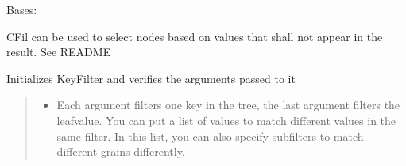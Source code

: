 \documentclass[a4paper,10pt,english]{sphinxmanual}
\begin{document}

\begin{fulllineitems}
\label{\detokenize{fagus.filters:fagus.filters.CFil}}
\pysigstartsignatures
{}
\pysigstopsignatures
\sphinxAtStartPar
Bases: {\hyperref[\detokenize{fagus.filters:fagus.filters.KFil}]{}}

\sphinxAtStartPar
CFil \sphinxhyphen{} can be used to select nodes based on values that shall not appear in the result. See README

\begin{fulllineitems}
\label{\detokenize{fagus.filters:fagus.filters.CFil.__init__}}
\pysigstartsignatures
{}
\pysigstopsignatures
\sphinxAtStartPar
Initializes KeyFilter and verifies the arguments passed to it
\begin{quote}\begin{description}
\begin{itemize}
\item {}
\sphinxAtStartPar
{} \textendash{} Each argument filters one key in the tree, the last argument filters the leaf\sphinxhyphen{}value. You can
put a list of values to match different values in the same filter. In this list, you can also specify
subfilters to match different grains differently.


\end{itemize}
\end{description}
\end{quote}
\end{fulllineitems}
\end{fulllineitems}
\end{document}
